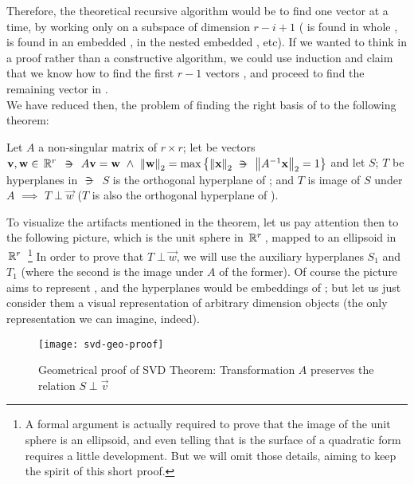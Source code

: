 Therefore, the theoretical recursive algorithm would be to find one vector
 at a time, by working only on a subspace of dimension
$r-i+1$ ( is found in whole ,  is found in an
embedded ,  in the nested embedded , etc). If
we wanted to think in a proof rather than a constructive algorithm, we
could use induction and claim that we know how to find the first $r-1$
vectors , and proceed to find the remaining vector in . \\

We have reduced then, the problem of finding the right basis of
 to the following theorem: \\

\begin{theorem}

\label{thm:svdgeo}
Let $A$ a non-singular matrix of $r \times r$; let be vectors
$\vec{v},\vec{w} \in \R{r} 
\suchthat A\vec{v} = \vec{w} \ds{\land} 
\norm{\vec{w}}_2 = \max\left\{\norm{\vec{x}}_2 \suchthat \norm{\inv{A}\vec{x}}_2= 1 \right\}$ 
and let $S$; $T$ be hyperplanes in
 $\suchthat$ $S$ is the orthogonal hyperplane of ; and $T$
is image of $S$ under $A$ $\implies$ $T \perp \vec{w}$ ($T$ is also the
orthogonal hyperplane of ).
\end{theorem}

To visualize the artifacts mentioned in the theorem, let us pay
attention then to the following picture, which is the unit 
sphere in $\,\mathbb{R}^{r}\,$, mapped to an ellipsoid in $\,\mathbb{R}^{r}\,$ \footnote{A
  formal argument is actually required to prove that the image of the
  unit sphere is an ellipsoid, and even telling that is the surface of
a quadratic form requires a little development. But we will omit those
details, aiming to keep the spirit of this short proof.} In order to
prove that $T \perp \vec{w}$, we will use the auxiliary hyperplanes
$S_1$ and $T_1$ (where the second is the image under $A$ of the
former). Of course the picture aims to represent , and 
the hyperplanes would be embeddings of ; but let us just consider
them a visual representation of arbitrary dimension objects (the only
representation we can imagine, indeed). \\

\begin{figure}[h]
  \centering
  \texttt{[image: svd-geo-proof]}
  \caption{Geometrical proof of SVD Theorem: Transformation $A$ preserves the
    relation $S \perp \vec{v}$}
  \label{fig:svdgeop}
\end{figure}
\hfill

